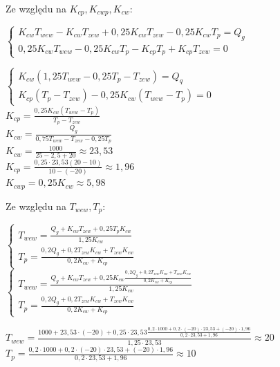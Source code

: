 \documentclass{article}
\begin{document}
Ze względu na $K_{cp}, K_{cwp}, K_{cw}$:
\begin{center}
    $
    \begin{cases}
        K_{cw}T_{wew}-K_{cw}T_{zew}+0,25K_{cw}T_{zew}-0,25K_{cw}T_{p}=Q_{g}\\
        0,25K_{cw}T_{wew}-0,25K_{cw}T_{p}-K_{cp}T_{p}+K_{cp}T_{zew}=0
    \end{cases}
    $
    
    $
    \begin{cases}
        K_{cw}(1,25T_{wew}-0,25T_{p}-T_{zew})=Q_{q}\\
        K_{cp}(T_{p}-T_{zew})-0,25K_{cw}(T_{wew}-T_{p})=0
    \end{cases}
    $
    \vspace{1ex}
    \\
    $
    K_{cp}=\frac{0,25K_{cw}(T_{wew}-T_{p})}{T_{p}-T_{zew}}
    $
    \\
    \vspace{1ex}
    $
    K_{cw}=\frac{Q_{g}}{0,75T_{wew}-T_{zew}-0,25T_{p}}
    $
    \\
    \vspace{1ex}
    $
    K_{cw}=\frac{1000}{25-2,5+20}\approx 23,53
    $
    \\
    \vspace{1ex}
    $
    K_{cp}=\frac{0,25 \cdot 23,53(20-10)}{10-(-20)}\approx1,96
    $
    \\
    \vspace{1ex}
    $
    K_{cwp}=0,25K_{cw}\approx 5,98
    $
\end{center}

Ze względu na  $T_{wew}, T_{p}$:
\begin{center}
    $
    \begin{cases}
        T_{wew}=\frac{Q_{g}+K_{cw}T_{zew}+0,25T_{p}K_{cw}}{1,25K_{cw}}\\
        T_{p}=\frac{0,2Q_{g}+0,2T_{zew}K_{cw}+T_{zew}K_{cw}}{0,2K_{cw}+K_{cp}}
    \end{cases}
    $
    \\
    \vspace{1ex}
    $
    \begin{cases}
        T_{wew}=\frac{Q_{g}+K_{cw}T_{zew}+0,25K_{cw}\frac{0,2Q_{g}+0,2T_{zew}K_{cw}+T_{zew}K_{cw}}{0,2K_{cw}+K_{cp}}}{1,25K_{cw}}\\
        T_{p}=\frac{0,2Q_{g}+0,2T_{zew}K_{cw}+T_{zew}K_{cw}}{0,2K_{cw}+K_{cp}}
    \end{cases}
    $
    \\
    \vspace{1ex}
   
    $
    T_{wew}=\frac{1000+23,53\cdot(-20)+0,25\cdot23,53\frac{0,2\cdot1000+0,2\cdot(-20)\cdot23,53+(-20)\cdot1,96}{0,2\cdot23,53+1,96}}{1,25\cdot23,53} \approx 20
    $\\
     \vspace{1ex}
    $
    T_{p}=\frac{0,2\cdot1000+0,2\cdot(-20)\cdot23,53+(-20)\cdot1,96}{0,2\cdot23,53+1,96} \approx 10
    $
\end{center}
\end{document}
